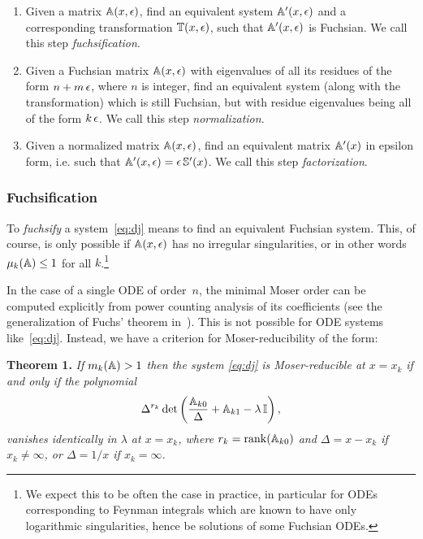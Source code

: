 \documentclass[12pt,a4paper]{article}
\begin{document}
\begin{enumerate}
    \item Given a matrix $\mathbb{A}(x,\epsilon)$, find an equivalent system $\mathbb{A}'(x,\epsilon)$ and a corresponding transformation $\mathbb{T}(x,\epsilon)$, such that $\mathbb{A}'(x,\epsilon)$ is Fuchsian. We call this step \textit{fuchsification}.
    \item Given a Fuchsian matrix $\mathbb{A}(x,\epsilon)$ with eigenvalues of all its residues of the form $n+m\,\epsilon$, where $n$ is integer, find an equivalent system (along with the transformation) which is still Fuchsian, but with residue eigenvalues being all of the form $k\,\epsilon$. We call this step \textit{normalization}.
    \item Given a normalized matrix $\mathbb{A}(x,\epsilon)$, find an equivalent matrix $\mathbb{A}'(x)$ in epsilon form, i.e. such that $\mathbb{A}'(x,\epsilon) = \epsilon \, \mathbb{S}'(x)$. We call this step \textit{factorization}.
\end{enumerate}


\subsubsection{Fuchsification}
\label{sec:fuchs}

To \textit{fuchsify} a system~\eqref{eq:dj} means to find an equivalent Fuchsian system.
This, of course, is only possible if $\mathbb{A}(x,\epsilon)$ has no irregular singularities, or in other words $\mu_k(\mathbb{A})\le1$ for all $k$.\footnote{
    We expect this to be often the case in practice, in particular for ODEs corresponding to Feynman integrals which are known to have only logarithmic singularities, hence be solutions of some Fuchsian ODEs.
}

In the case of a single ODE of order~$n$, the minimal Moser order can be computed explicitly from power counting analysis of its coefficients (see the generalization of Fuchs' theorem in~\cite{Mos59}).
This is not possible for ODE systems like~\eqref{eq:dj}.
Instead, we have a criterion for Moser-reducibility of the form:

\textbf{Theorem 1.}
{\em If $m_k(\mathbb{A}) > 1$ then the system \eqref{eq:dj} is Moser-reducible at $x=x_k$ if and only if the polynomial}
\begin{equation}
\label{eq:red_cond}
    \Delta^{r_k} \det\left(\frac{\mathbb{A}_{k0}}{\Delta} + \mathbb{A}_{k1} - \lambda \,\mathbb{I}\right),
\end{equation}
{\em vanishes identically in $\lambda$ at $x=x_k$, where $r_k=\mathrm{rank}(\mathbb{A}_{k0})$ and $\Delta=x-x_k$ if $x_k\ne\infty$, or $\Delta=1/x$ if $x_k=\infty$.}
\end{document}
